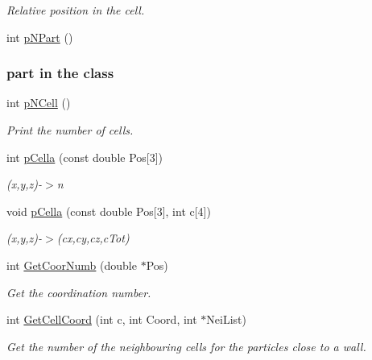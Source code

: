 \begin{DoxyCompactItemize}
\begin{DoxyCompactList}\small\item\em Relative position in the cell. \end{DoxyCompactList}\item 
int \hyperlink{classDomDecBasics_a388622b5e7d2ad20e8ac1a8a951d655f}{p\+N\+Part} ()
\begin{DoxyCompactList}\small\item\em \subsubsection*{part in the class}\end{DoxyCompactList}\item 
int \hyperlink{classDomDecBasics_a02631cacc3cd393a64b7e78df3734e48}{p\+N\+Cell} ()
\begin{DoxyCompactList}\small\item\em Print the number of cells. \end{DoxyCompactList}\item 
int \hyperlink{classDomDecBasics_a8bc667d6b3e872a9cabbb54f1eb671e8}{p\+Cella} (const double Pos\mbox{[}3\mbox{]})
\begin{DoxyCompactList}\small\item\em (x,y,z)-\/$>$n \end{DoxyCompactList}\item 
void \hyperlink{classDomDecBasics_a328df10e55925d98bc8ca3daa5ca4f96}{p\+Cella} (const double Pos\mbox{[}3\mbox{]}, int c\mbox{[}4\mbox{]})
\begin{DoxyCompactList}\small\item\em (x,y,z)-\/$>$(cx,cy,cz,c\+Tot) \end{DoxyCompactList}\item 
int \hyperlink{classDomDecBasics_a14d68ab6ae97b1ddd6c8a56ec9607f87}{Get\+Coor\+Numb} (double $\ast$Pos)
\begin{DoxyCompactList}\small\item\em Get the coordination number. \end{DoxyCompactList}\item 
int \hyperlink{classDomDecBasics_a99b8d5719387a53ac431da0b85694056}{Get\+Cell\+Coord} (int c, int Coord, int $\ast$Nei\+List)
\begin{DoxyCompactList}\small\item\em Get the number of the neighbouring cells for the particles close to a wall. \end{DoxyCompactList}\item 

\end{DoxyCompactItemize}

